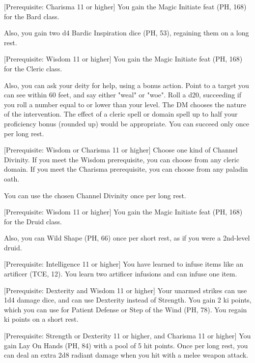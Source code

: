 \documentclass[letterpaper,twocolumn,openany,nodeprecatedcode,bg=print]{dndbook}
\begin{document}
[Prerequisite: Charisma 11 or higher]
\label{bard-initiate}
You gain the Magic Initiate feat (PH, 168) for the Bard class.

Also, you gain two d4 Bardic Inspiration dice (PH, 53), regaining them on a long rest.

[Prerequisite: Wisdom 11 or higher]
\label{cleric-initiate}
You gain the Magic Initiate feat (PH, 168) for the Cleric class.

Also, you can ask your deity for help, using a bonus action. 
Point to a target you can see within 60 feet, and say either "weal" or "woe". 
Roll a d20, succeeding if you roll a number equal to or lower than your level.
The DM chooses the nature of the intervention.
The effect of a cleric spell or domain spell up to half your proficiency bonus (rounded up) would be appropriate. 
You can succeed only once per long rest.

[Prerequisite: Wisdom or Charisma 11 or higher]
\label{divine-initiate}
Choose one kind of Channel Divinity. 
If you meet the Wisdom prerequisite, you can choose from any cleric domain. 
If you meet the Charisma prerequisite, you can choose from any paladin oath. 

You can use the chosen Channel Divinity once per long rest.

[Prerequisite: Wisdom 11 or higher]
\label{druid-initiate}
You gain the Magic Initiate feat (PH, 168) for the Druid class.

Also, you can Wild Shape (PH, 66) once per short rest, as if you were a 2nd-level druid.

[Prerequisite: Intelligence 11 or higher]
\label{infuser-initiate}
You have learned to infuse items like an artificer (TCE, 12). 
You learn two artificer infusions and can infuse one item.

[Prerequisite: Dexterity and Wisdom 11 or higher]
\label{monk-initiate}
Your unarmed strikes can use 1d4 damage dice, and can use Dexterity instead of Strength. You gain 2 ki points, which you can use for Patient Defense or Step of the Wind (PH, 78). You regain ki points on a short rest.

[Prerequisite: Strength or Dexterity 11 or higher, and Charisma 11 or higher]
\label{paladin-initiate}
You gain Lay On Hands (PH, 84) with a pool of 5 hit points. Once per long rest, you can deal an extra 2d8 radiant damage when you hit with a melee weapon attack.
\end{document}
